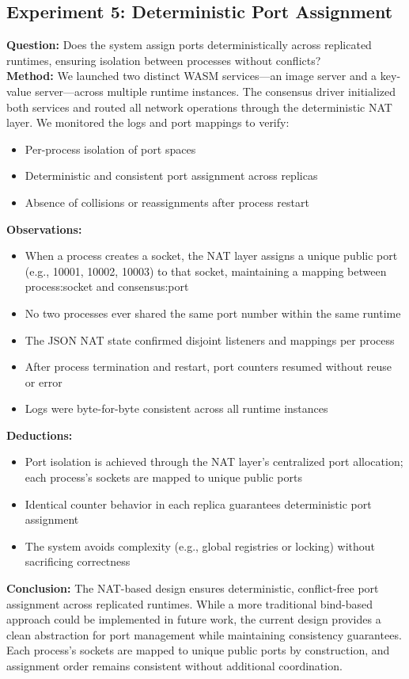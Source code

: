 \documentclass[10pt, 
]{IEEEtran}
\begin{document}
\subsection{Experiment 5: Deterministic Port Assignment}
\textbf{Question:} Does the system assign ports deterministically across replicated runtimes, ensuring isolation between processes without conflicts? \\
\textbf{Method:} We launched two distinct WASM services—an image server and a key-value server—across multiple runtime instances. The consensus driver initialized both services and routed all network operations through the deterministic NAT layer. We monitored the logs and port mappings to verify:
\begin{itemize}
    \item Per-process isolation of port spaces
    \item Deterministic and consistent port assignment across replicas
    \item Absence of collisions or reassignments after process restart
\end{itemize}
\textbf{Observations:}
\begin{itemize}
    \item When a process creates a socket, the NAT layer assigns a unique public port (e.g., 10001, 10002, 10003) to that socket, maintaining a mapping between process:socket and consensus:port
    \item No two processes ever shared the same port number within the same runtime
    \item The JSON NAT state confirmed disjoint listeners and mappings per process
    \item After process termination and restart, port counters resumed without reuse or error
    \item Logs were byte-for-byte consistent across all runtime instances
\end{itemize}
\textbf{Deductions:}
\begin{itemize}
    \item Port isolation is achieved through the NAT layer's centralized port allocation; each process's sockets are mapped to unique public ports
    \item Identical counter behavior in each replica guarantees deterministic port assignment
    \item The system avoids complexity (e.g., global registries or locking) without sacrificing correctness
\end{itemize}
\textbf{Conclusion:} The NAT-based design ensures deterministic, conflict-free port assignment across replicated runtimes. While a more traditional bind-based approach could be implemented in future work, the current design provides a clean abstraction for port management while maintaining consistency guarantees. Each process's sockets are mapped to unique public ports by construction, and assignment order remains consistent without additional coordination.
\end{document}

